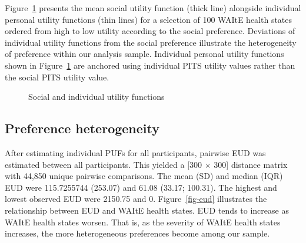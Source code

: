 \documentclass[
  number,
  preprint]{elsarticle}
\begin{document}
Figure~\ref{fig-sufplain} presents the mean social utility function
(thick line) alongside individual personal utility functions (thin
lines) for a selection of 100 WAItE health states ordered from high to
low utility according to the social preference. Deviations of individual
utility functions from the social preference illustrate the
heterogeneity of preference within our analysis sample. Individual
personal utility functions shown in Figure~\ref{fig-sufplain} are
anchored using individual PITS utility values rather than the social
PITS utility value.

\begin{figure}


\caption{\label{fig-sufplain}Social and individual utility functions}

\end{figure}%

\subsection{Preference heterogeneity}\label{preference-heterogeneity-1}

After estimating individual PUFs for all participants, pairwise EUD was
estimated between all participants. This yielded a {[}300 \(\times\)
300{]} distance matrix with 44,850 unique pairwise comparisons. The mean
(SD) and median (IQR) EUD were 115.7255744 (253.07) and 61.08 (33.17;
100.31). The highest and lowest observed EUD were 2150.75 and 0.
Figure~\ref{fig-eud} illustrates the relationship between EUD and WAItE
health states. EUD tends to increase as WAItE health states worsen. That
is, as the severity of WAItE health states increases, the more
heterogeneous preferences become among our sample.
\end{document}

